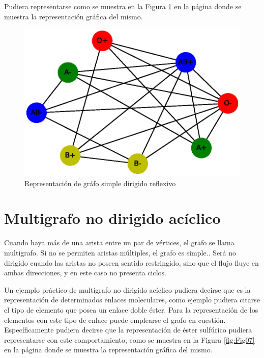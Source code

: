 \documentclass{article}
\begin{document}
Pudiera representarse como se muestra en la Figura \ref{fig:Fig06} en la página \pageref{fig:Fig06} donde se muestra la representación gráfica del mismo.



\begin{figure}
    \centering
    \includegraphics[scale=0.6]{imagenes/Fig06.eps}
    \caption{Representación de gráfo simple dirigido reflexivo}
    \label{fig:Fig06}
\end{figure}

\section{Multigrafo no dirigido acíclico}

Cuando haya más de una arista entre un par de vértices, el grafo se llama multígrafo. Si no se permiten aristas múltiples, el grafo es simple.\cite{Elisa}. Será no dirigido cuando las aristas no poseen sentido restringido, sino que el flujo fluye en ambas direcciones, y en este caso no presenta ciclos.

Un ejemplo práctico de multígrafo no dirigido acíclico pudiera decirse que es la representación de determinados enlaces moleculares, como ejemplo pudiera citarse el tipo de elemento que posea un enlace doble éster. Para la representación de los elementos con este tipo de enlace puede emplearse el grafo en cuestión. Específicamente pudiera decirse que la representación de éster sulfúrico pudiera representarse con este comportamiento, como se muestra en la Figura \ref{fig:Fig07} en la página \pageref{fig:Fig07} donde se muestra la representación gráfica del mismo. 
\end{document}
